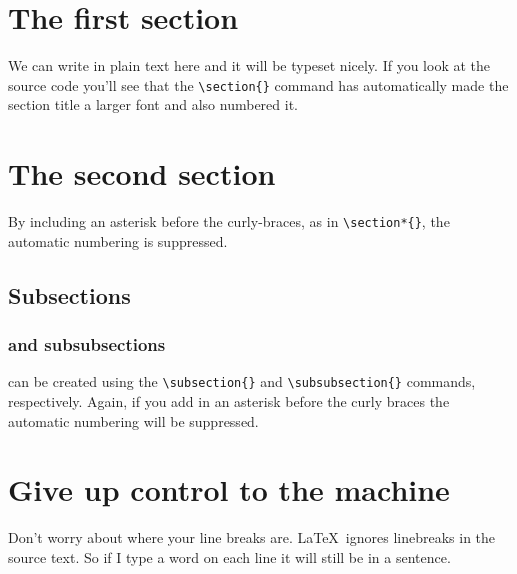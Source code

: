 \documentclass[12pt,a4paper]{article}
\begin{document}

\section{The first section}
  We can write in plain text here and it will be typeset nicely.  If you
  look at the source code you'll see that the \verb|\section{}| command 
    has automatically made the section title a larger font and also numbered it.  

  \section*{The second section}
    By including an asterisk before the curly-braces, as in
  \verb|\section*{}|,  the automatic numbering is suppressed.  

  \subsection{Subsections}
  \subsubsection{and subsubsections}
  can be created using the \verb|\subsection{}| and
  \verb|\subsubsection{}| commands, respectively.  Again, if you add in
  an asterisk before the curly braces the automatic numbering will be
  suppressed. 

\section{Give up control to the machine}
  Don't worry about where your line breaks are.  \LaTeX\ ignores
  linebreaks in the source text.  
  So
  if
  I
  type
  a
  word
  on
  each
  line
  it
  will
  still
  be
  in
  a
  sentence.
\end{document}
